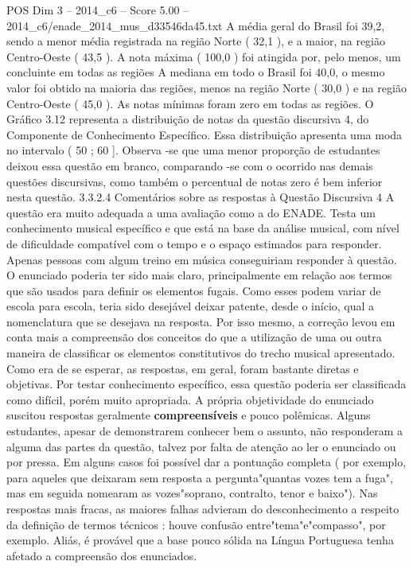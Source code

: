 \begin{textsample}{POS Dim 3 – 2014\_c6 – Score 5.00 – 2014\_c6/enade\_2014\_mus\_d33546da45.txt}
A média geral do Brasil foi 39,2, sendo a menor média registrada na região Norte ( 32,1 ), e a maior, na região Centro-Oeste ( 43,5 ).
A nota máxima ( 100,0 ) foi atingida por, pelo menos, um concluinte em todas as regiões A mediana em todo o Brasil foi 40,0, o mesmo valor foi obtido na maioria das regiões, menos na região Norte ( 30,0 ) e na região Centro-Oeste ( 45,0 ).
As notas mínimas foram zero em todas as regiões.
O Gráfico 3.12 representa a distribuição de notas da questão discursiva 4, do Componente de Conhecimento Específico.
Essa distribuição apresenta uma moda no intervalo ( 50 ; 60 ].
Observa -se que uma menor proporção de estudantes deixou essa questão em branco, comparando -se com o ocorrido nas demais questões discursivas, como também o percentual de notas zero é bem inferior nesta questão. 3.3.2.4 Comentários sobre as respostas à Questão Discursiva 4 A questão era muito adequada a uma avaliação como a do ENADE.
Testa um conhecimento musical específico e que está na base da análise musical, com nível de dificuldade compatível com o tempo e o espaço estimados para responder.
Apenas pessoas com algum treino em música conseguiriam responder à questão.
O enunciado poderia ter sido mais claro, principalmente em relação aos termos que são usados para definir os elementos fugais.
Como esses podem variar de escola para escola, teria sido desejável deixar patente, desde o início, qual a nomenclatura que se desejava na resposta.
Por isso mesmo, a correção levou em conta mais a compreensão dos conceitos do que a utilização de uma ou outra maneira de classificar os elementos constitutivos do trecho musical apresentado.
Como era de se esperar, as respostas, em geral, foram bastante diretas e objetivas.
Por testar conhecimento específico, essa questão poderia ser classificada como difícil, porém muito apropriada.
A própria objetividade do enunciado suscitou respostas geralmente \textbf{compreensíveis} e pouco polêmicas.
Alguns estudantes, apesar de demonstrarem conhecer bem o assunto, não responderam a alguma das partes da questão, talvez por falta de atenção ao ler o enunciado ou por pressa.
Em alguns casos foi possível dar a pontuação completa ( por exemplo, para aqueles que deixaram sem resposta a pergunta"quantas vozes tem a fuga", mas em seguida nomearam as vozes"soprano, contralto, tenor e baixo").
Nas respostas mais fracas, as maiores falhas advieram do desconhecimento a respeito da definição de termos técnicos : houve confusão entre"tema"e"compasso", por exemplo.
Aliás, é provável que a base pouco sólida na Língua Portuguesa tenha afetado a compreensão dos enunciados.

\end{textsample}
